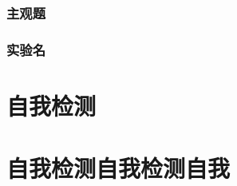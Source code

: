 \documentclass[color=COLORFUL]{textbook-cn}%
\begin{document}
\lipsum[1-6]
\begin{Improve}
\begin{QsNum}
\item \lipsum[1][1-4]
\item \lipsum[1][1-4]
\item \lipsum[1][1-4]
\item \lipsum[1][1-4]
\item \lipsum[1][1-4]
\item \lipsum[1][1-4]
\item \lipsum[1][1-4]
\item \lipsum[1][1-4]
\end{QsNum}
\begin{QsNum}
\item \lipsum[1][1-4]
\item \lipsum[1][1-4]
\item \lipsum[1][1-4]
\item \lipsum[1][1-4]
\item \lipsum[1][1-4]
\item \lipsum[1][1-4]
\item \lipsum[1][1-4]
\item \lipsum[1][1-4]
\end{QsNum}
\tcblower
\lipsum[1]
\end{Improve}





\begin{Quiz}
\section{主观题}
\end{Quiz}



\begin{Project}
\section{实验名}

\begin{Theorem*}[定理名称]
\lipsum[1][1-3]
\end{Theorem*}
\end{Project}


\part*{自我检测}
\part*{自我检测自我检测自我}
\end{document}
